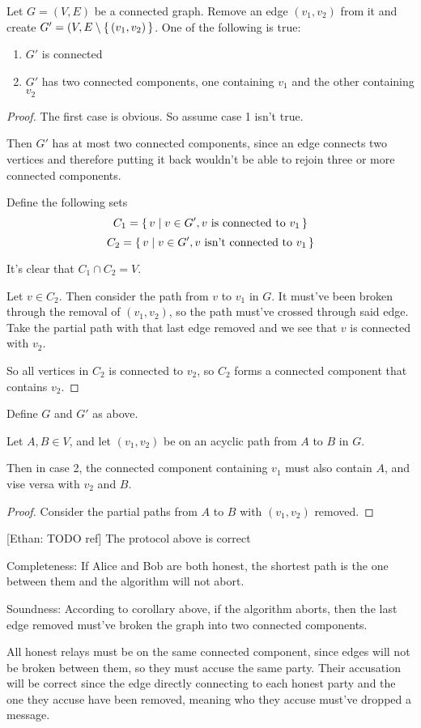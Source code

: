 \documentclass{article}
\newcommand{\Ethan}[1]{{\footnotesize\color{magenta}[Ethan: #1]}}
\begin{document}
\begin{thm}
	Let $G=(V,E)$ be a connected graph. Remove an edge $(v_1, v_2)$ from it and create $G'=(V,E\setminus\set{(v_1, v_2)}$. One of the following is true:
	\begin{enumerate}
	\item $G'$ is connected
	\item $G'$ has two connected components, one containing $v_1$ and the other containing $v_2$
	\end{enumerate}
\end{thm}
\begin{proof}
The first case is obvious. So assume case 1 isn't true.

Then $G'$ has at most two connected components, since an edge connects two vertices and therefore putting it back wouldn't be able to rejoin three or more connected components.

Define the following sets
$$C_1=\set{v|v\in G', v \textnormal{ is connected to } v_1}$$
$$C_2=\set{v|v\in G', v \textnormal{ isn't connected to } v_1}$$

It's clear that $C_1\cap C_2=V$.

Let $v\in C_2$. Then consider the path from $v$ to $v_1$ in $G$. It must've been broken through the removal of $(v_1, v_2)$, so the path must've crossed through said edge.
Take the partial path with that last edge removed and we see that $v$ is connected with $v_2$.

So all vertices in $C_2$ is connected to $v_2$, so $C_2$ forms a connected component that contains $v_2$.
\end{proof}
\begin{cor}
Define $G$ and $G'$ as above.

Let $A, B\in V$, and let $(v_1, v_2)$ be on an acyclic path from $A$ to $B$ in $G$.

Then in case 2, the connected component containing $v_1$ must also contain $A$, and vise versa with $v_2$ and $B$.
\end{cor}
\begin{proof}
Consider the partial paths from $A$ to $B$ with $(v_1, v_2)$ removed.
\end{proof}

\begin{thm}
\Ethan{TODO ref} The protocol above is correct

Completeness: If Alice and Bob are both honest, the shortest path is the one between them and the algorithm will not abort.

Soundness:
According to corollary above, if the algorithm aborts, then the last edge removed must've broken the graph into two connected components.

All honest relays must be on the same connected component, since edges will not be broken between them, so they must accuse the same party.
Their accusation will be correct since the edge directly connecting to each honest party and the one they accuse have been removed, meaning who they accuse must've dropped a message.

\end{thm}
\end{document}
